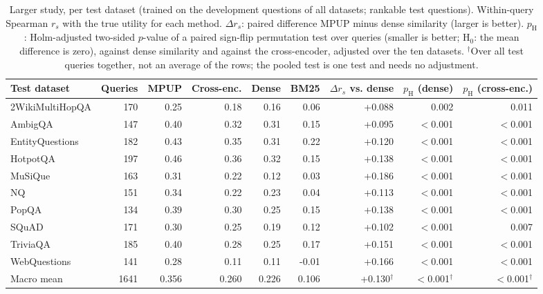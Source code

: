 \documentclass[conference]{IEEEtran}
\begin{document}
\begin{table}[htbp]
    \centering
    \caption{Larger study, per test dataset (trained on the development questions of all datasets; rankable test questions). Within-query Spearman $r_s$ with the true utility for each method. $\Delta r_s$: paired difference MPUP minus dense similarity (larger is better). $p_{\mathrm{H}}$: Holm-adjusted two-sided $p$-value of a paired sign-flip permutation test over queries (smaller is better; H$_0$: the mean difference is zero), against dense similarity and against the cross-encoder, adjusted over the ten datasets. $^{\dagger}$Over all test queries together, not an average of the rows; the pooled test is one test and needs no adjustment.}
    \label{tab:bigdata}
    \footnotesize
    \begin{tabular}{lrrrrrrrr}
        \toprule
        \textbf{Test dataset} & \textbf{Queries} & \textbf{MPUP} & \textbf{Cross-enc.} & \textbf{Dense} & \textbf{BM25} & \textbf{$\Delta r_s$ vs. dense} & \textbf{$p_{\mathrm{H}}$ (dense)} & \textbf{$p_{\mathrm{H}}$ (cross-enc.)} \\
        \midrule
        2WikiMultiHopQA & 170 & 0.25 & 0.18 & 0.16 & 0.06 & +0.088 & 0.002 & 0.011 \\
        AmbigQA & 147 & 0.40 & 0.32 & 0.31 & 0.15 & +0.095 & $<$0.001 & $<$0.001 \\
        EntityQuestions & 182 & 0.43 & 0.35 & 0.31 & 0.22 & +0.120 & $<$0.001 & $<$0.001 \\
        HotpotQA & 197 & 0.46 & 0.36 & 0.32 & 0.15 & +0.138 & $<$0.001 & $<$0.001 \\
        MuSiQue & 163 & 0.31 & 0.22 & 0.12 & 0.03 & +0.186 & $<$0.001 & $<$0.001 \\
        NQ & 151 & 0.34 & 0.22 & 0.23 & 0.04 & +0.113 & $<$0.001 & $<$0.001 \\
        PopQA & 134 & 0.39 & 0.30 & 0.25 & 0.15 & +0.138 & $<$0.001 & $<$0.001 \\
        SQuAD & 171 & 0.30 & 0.25 & 0.19 & 0.12 & +0.102 & $<$0.001 & 0.007 \\
        TriviaQA & 185 & 0.40 & 0.28 & 0.25 & 0.17 & +0.151 & $<$0.001 & $<$0.001 \\
        WebQuestions & 141 & 0.28 & 0.11 & 0.11 & -0.01 & +0.166 & $<$0.001 & $<$0.001 \\
        \midrule
        Macro mean & 1641 & 0.356 & 0.260 & 0.226 & 0.106 & +0.130$^{\dagger}$ & $<$0.001$^{\dagger}$ & $<$0.001$^{\dagger}$ \\
        \bottomrule
    \end{tabular}
\end{table}
\end{document}
